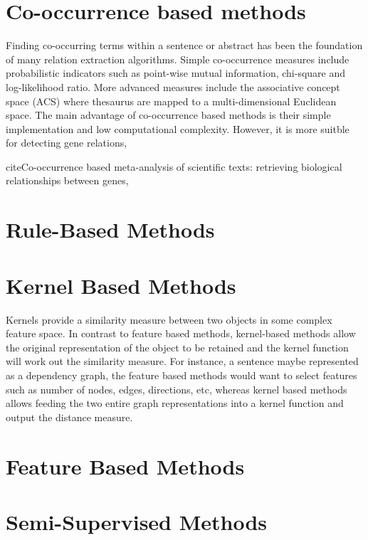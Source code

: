 \section{Co-occurrence based methods}%
Finding co-occurring terms within a sentence or abstract has been the foundation of many relation extraction algorithms\cite{chaussabel2002mining,becker2003pubmatrix,tanabe1999medminer,stapley2000biobibliometrics,jenssen2001literature,wren2004knowledge}. Simple co-occurrence measures include probabilistic indicators such as point-wise mutual information, chi-square and log-likelihood ratio. More advanced measures include the associative concept space (ACS) where thesaurus are mapped to a multi-dimensional Euclidean space\cite{van2004constructing}. The main advantage of co-occurrence based methods is their simple implementation and low computational complexity. However, it is more suitble for detecting 	gene relations, 

cite{Co-occurrence based meta-analysis of scientific texts:
	retrieving biological relationships between genes}, 
\section{Rule-Based Methods}

\section{Kernel Based Methods} 
Kernels provide a similarity measure between two objects in some complex feature space. In contrast to feature based methods, kernel-based methods allow the original representation of the object to be retained and the kernel function will work out the similarity measure. For instance, a sentence maybe represented as a dependency graph, the feature based methods would want to select features such as number of nodes, edges, directions, etc, whereas kernel based methods allows feeding the two entire graph representations into a kernel function and output the distance measure.

\section{Feature Based Methods}  %
\label{section1.3}

\section{Semi-Supervised Methods}